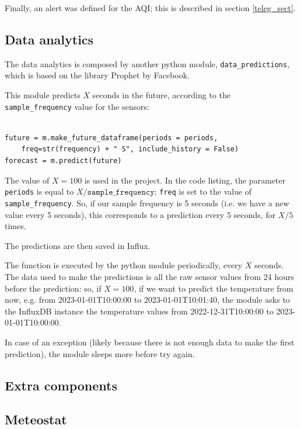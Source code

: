 \documentclass[]{article}
\begin{document}
Finally, an alert was defined for the AQI; this is described in section \ref{teleg_sect}. 

\subsection{Data analytics}
The data analytics is composed by another python module, \texttt{data\_predictions}, which is based on the library Prophet by Facebook.

This module predicts $ X $ seconds in the future, according to the \texttt{sample\_frequency} value for the sensors:

\begin{lstlisting}[style=Python, caption=Prophet prediction ($ X $ is \texttt{frequency} in the example)]

future = m.make_future_dataframe(periods = periods, 
	freq=str(frequency) + " S", include_history = False)
forecast = m.predict(future)
\end{lstlisting}

The value of $ X = 100 $ is used in the project. In the code listing, the parameter \texttt{periods} is equal to $ X / \texttt{sample\_frequency} $; \texttt{freq}  is set to the value of \texttt{sample\_frequency}. So, if our sample frequency is 5 seconds (i.e. we have a new value every 5 seconds), this corresponds to a prediction every 5 seconds, for $ X/5 $ times. 

The predictions are then saved in Influx.

The function is executed by the python module periodically, every $ X  $ seconds. The data used to make the predictions is all the raw sensor values from 24 hours before the prediction: so, if $ X = 100 $, if we want to predict the temperature from now, e.g. from 2023-01-01T10:00:00 to 2023-01-01T10:01:40, the module asks to the InfluxDB instance the temperature values from 2022-12-31T10:00:00 to 2023-01-01T10:00:00. 

In case of an exception (likely because there is not enough data to make the first prediction), the module sleeps more before try again. 

\subsection{Extra components}

\subsection{Meteostat}
\end{document}

